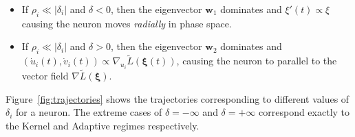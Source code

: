 \begin{itemize}
    \item If $\rho_i \ll |\delta_i|$ and $\delta < 0$, then the eigenvector $\bm w_1$ dominates and $\xi'(t) \propto \xi$ causing the neuron moves \emph{radially} in phase space.
    \item If $\rho_i \ll |\delta_i|$ and $\delta > 0$, then the eigenvector $\bm w_2$ dominates and $(\dot u_i(t), \dot v_i(t)) \propto \nabla_{u_i} \tilde L(\bm \xi(t))$, causing the neuron to parallel to the vector field $\nabla \tilde L(\bm \xi)$.
\end{itemize}

Figure~\ref{fig:trajectories} shows the trajectories corresponding to different values of $\delta_i$ for a neuron. The extreme cases of $\delta = -\infty$ and $\delta = +\infty$ correspond exactly to the Kernel and Adaptive regimes respectively. 


